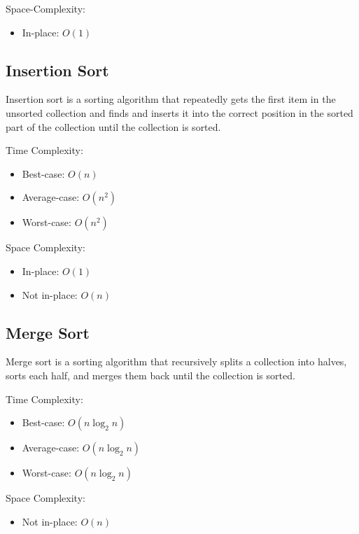 Space-Complexity:

\begin{itemize}
  \item In-place: $O(1)$
\end{itemize}

\subsection{Insertion Sort}

Insertion sort is a sorting algorithm that repeatedly gets the first item in the unsorted collection and finds and inserts it into the correct position in the sorted part of the collection until the collection is sorted.

Time Complexity:

\begin{itemize}
  \item Best-case: $O(n)$
  \item Average-case: $O(n^2)$
  \item Worst-case: $O(n^2)$
\end{itemize}

Space Complexity:

\begin{itemize}
  \item In-place: $O(1)$
  \item Not in-place: $O(n)$
\end{itemize}

\subsection{Merge Sort}

Merge sort is a sorting algorithm that recursively splits a collection into halves, sorts each half, and merges them back until the collection is sorted.

Time Complexity: 

\begin{itemize}
  \item Best-case: $O(n\log_{2}n)$
  \item Average-case: $O(n\log_{2}n)$
  \item Worst-case: $O(n\log_{2}n)$
\end{itemize}

Space Complexity:

\begin{itemize}
  \item Not in-place: $O(n)$
\end{itemize}

